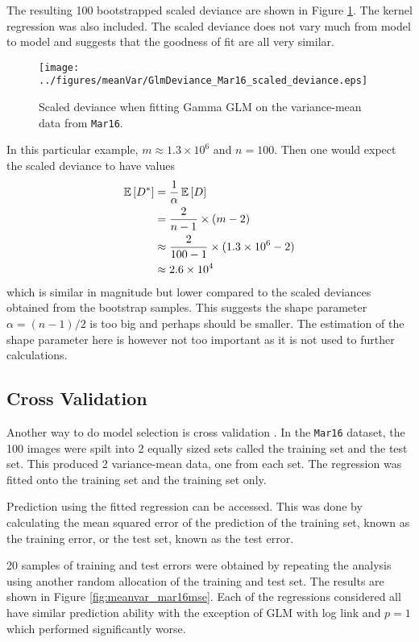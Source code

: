 The resulting 100 bootstrapped scaled deviance are shown in Figure \ref{fig:meanvar_deviance_mar16}. The kernel regression was also included. The scaled deviance does not vary much from model to model and suggests that the goodness of fit are all very similar.

\begin{figure}
    \centering
    \texttt{[image: ../figures/meanVar/GlmDeviance\_Mar16\_scaled\_deviance.eps]}
    \caption{Scaled deviance when fitting Gamma GLM on the variance-mean data from \texttt{Mar16}.}
    \label{fig:meanvar_deviance_mar16}
\end{figure}

In this particular example, $m\approx 1.3\times 10^6$ and $n=100$. Then one would expect the scaled deviance to have values
\begin{align*}
    \operatorname{\mathbb{E}}\left[D^*\right]&=\frac{1}{\alpha}\operatorname{\mathbb{E}}\left[D\right]
    \\
    &=\frac{2}{n-1}\times (m-2)
    \\
    &\approx \frac{2}{100-1}\times (1.3\times 10^6-2)
    \\
    &\approx 2.6 \times 10^4
\end{align*}
which is similar in magnitude but lower compared to the scaled deviances obtained from the bootstrap samples. This suggests the shape parameter $\alpha=(n-1)/2$ is too big and perhaps should be smaller. The estimation of the shape parameter here is however not too important as it is not used to further calculations.

\subsection{Cross Validation}

Another way to do model selection is cross validation \cite{friedman2001elements}. In the \texttt{Mar16} dataset, the 100 images were spilt into 2 equally sized sets called the training set and the test set. This produced 2 variance-mean data, one from each set. The regression was fitted onto the training set and the training set only.

Prediction using the fitted regression can be accessed. This was done by calculating the mean squared error of the prediction of the training set, known as the training error, or the test set, known as the test error.

20 samples of training and test errors were obtained by repeating the analysis using another random allocation of the training and test set. The results are shown in Figure \ref{fig:meanvar_mar16mse}. Each of the regressions considered all have similar prediction ability with the exception of GLM with log link and $p=1$ which performed significantly worse.

